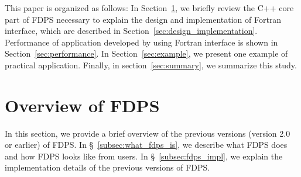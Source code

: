 \documentclass[twocolumn,useamsfonts]{pasj01}
\begin{document}
This paper is organized as follows: In Section~\ref{sec:overview_of_fdps}, we briefly review the C++ core part of FDPS necessary to explain the design and implementation of Fortran interface, which are described in Section~\ref{sec:design_implementation}. Performance of application developed by using Fortran interface is shown in Section~\ref{sec:performance}. In Section~\ref{sec:example}, we present one example of practical application.  Finally, in section~\ref{sec:summary}, we summarize this study.


\section{Overview of FDPS}
\label{sec:overview_of_fdps}
In this section, we provide a brief overview of the previous versions (version 2.0 or earlier) of FDPS. In \S~\ref{subsec:what_fdps_is}, we describe what FDPS does and how FDPS looks like from users. In \S~\ref{subsec:fdps_impl}, we explain the implementation details of the previous versions of FDPS. 

\end{document}
